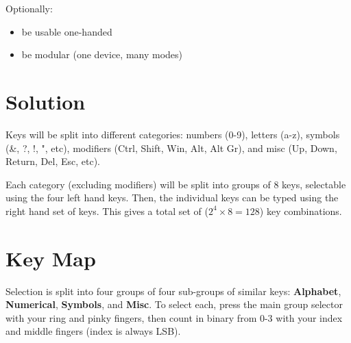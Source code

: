 \documentclass{article}
\begin{document}
Optionally:
\begin{itemize}
	\item be usable one-handed
	\item be modular (one device, many modes)
\end{itemize}

\section{Solution}
Keys will be split into different categories: numbers (0-9), letters (a-z), symbols (\&, ?, !, ", etc), modifiers (Ctrl, Shift, Win, Alt, Alt Gr), and misc (Up, Down, Return, Del, Esc, etc).

Each category (excluding modifiers) will be split into groups of 8 keys, selectable using the four left hand keys. Then, the individual keys can be typed using the right hand set of keys. This gives a total set of ($2^4 \times 8 = 128$) key combinations.

\section{Key Map}

Selection is split into four groups of four sub-groups of similar keys: \textbf{Alphabet}, \textbf{Numerical}, \textbf{Symbols}, and \textbf{Misc}. To select each, press the main group selector with your ring and pinky fingers, then count in binary from 0-3 with your index and middle fingers (index is always LSB).
\end{document}
